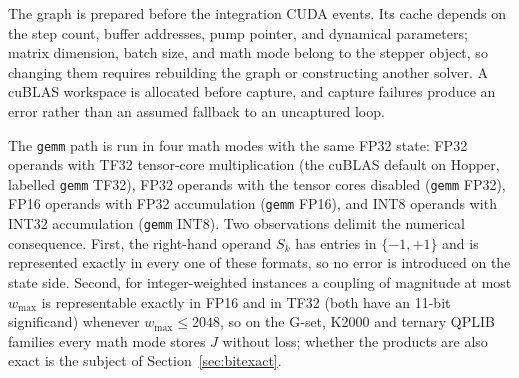 \documentclass[11pt,a4paper]{article}
\newcommand{\code}[1]{\texttt{#1}}
\begin{document}
The graph is prepared before the integration CUDA events. Its cache depends on the step count, buffer addresses, pump pointer, and dynamical parameters; matrix dimension, batch size, and math mode belong to the stepper object, so changing them requires rebuilding the graph or constructing another solver. A cuBLAS workspace is allocated before capture, and capture failures produce an error rather than an assumed fallback to an uncaptured loop.

The \code{gemm} path is run in four math modes with the same FP32 state: FP32 operands with TF32 tensor-core multiplication (the cuBLAS default on Hopper, labelled \code{gemm} TF32), FP32 operands with the tensor cores disabled (\code{gemm} FP32), FP16 operands with FP32 accumulation (\code{gemm} FP16), and INT8 operands with INT32 accumulation (\code{gemm} INT8). Two observations delimit the numerical consequence. First, the right-hand operand $S_k$ has entries in $\{-1,+1\}$ and is represented exactly in every one of these formats, so no error is introduced on the state side. Second, for integer-weighted instances a coupling of magnitude at most $w_{\max}$ is representable exactly in FP16 and in TF32 (both have an 11-bit significand) whenever $w_{\max}\le 2048$, so on the G-set, K2000 and ternary QPLIB families every math mode stores $J$ without loss; whether the products are also exact is the subject of Section~\ref{sec:bitexact}.
\end{document}
